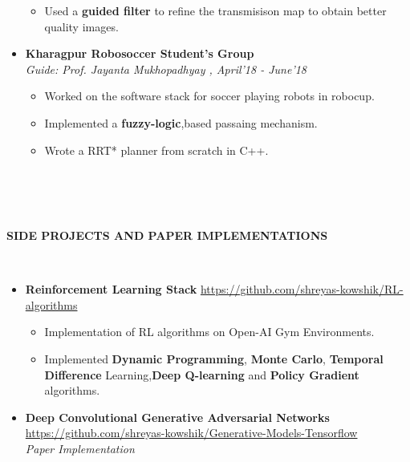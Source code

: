 \documentclass[a4paper,10pt]{article}
\newcommand{\isep}{-2 pt}
\newcommand{\lsep}{-0.5cm}
\newcommand{\resheading}[1]{{\small \colorbox{mygrey}{\begin{minipage}{0.975\textwidth}{\textbf{#1 \vphantom{p\^{E}}}}\end{minipage}}}}
\begin{document}
\begin{itemize}
\begin{itemize}
	\item Used a \textbf{guided filter} to refine the transmisison map to obtain better quality images. 
	\end{itemize} 
	
\item \textbf{Kharagpur Robosoccer Student's Group} \\ 
 \emph{Guide: Prof. Jayanta Mukhopadhyay										
, April'18 - June'18} \\[-0.6cm]
	\begin{itemize}\itemsep \isep
	\item Worked on the software stack for soccer playing robots in robocup.
	\item Implemented a \textbf{fuzzy-logic},based passaing mechanism.
	\item Wrote a RRT* planner from scratch in C++. \\ \\
	\end{itemize} 
\end{itemize}

\hspace{0.5cm}\\[-0.2cm]

\hspace{0.5cm}\\[-0.2cm]

\resheading{\textbf{SIDE PROJECTS AND PAPER IMPLEMENTATIONS} }\\[\lsep]
\begin{itemize}
\item \textbf{Reinforcement Learning Stack} \hspace{1.0cm} \url{https://github.com/shreyas-kowshik/RL-algorithms}
	\begin{itemize}\itemsep \isep
	\item Implementation of RL algorithms on Open-AI Gym Environments.
	
	\item Implemented \textbf{Dynamic Programming}, \textbf{Monte Carlo}, \textbf{Temporal Difference} Learning,\textbf{Deep Q-learning} and \textbf{Policy Gradient} algorithms. 
	\end{itemize}
	
\item \textbf{Deep Convolutional Generative Adversarial Networks} \hspace{0.5cm} \url{https://github.com/shreyas-kowshik/Generative-Models-Tensorflow} \\
\emph{Paper Implementation}

\end{itemize}
\end{document}
